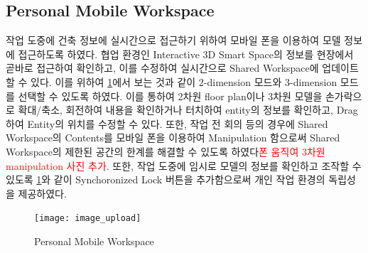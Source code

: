 \subsection{Personal Mobile Workspace}
작업 도중에 건축 정보에 실시간으로 접근하기 위하여 모바일 폰을 이용하여 모델 정보에 접근하도록 하였다. 협업 환경인 Interactive 3D Smart Space의 정보를 현장에서 곧바로 접근하여 확인하고, 이를 수정하여 실시간으로 Shared Workspace에 업데이트할 수 있다. 이를 위하여 \ref{fig:pmw}에서 보는 것과 같이 2-dimension 모드와 3-dimension 모드를 선택할 수 있도록 하였다. 이를 통하여 2차원 floor plan이나 3차원 모델을 손가락으로 확대/축소, 회전하여 내용을 확인하거나 터치하여 entity의 정보를 확인하고, Drag하여 Entity의 위치를 수정할 수 있다. 또한, 작업 전 회의 등의 경우에 Shared Workspace의 Contents를 모바일 폰을 이용하여 Manipulation 함으로써 Shared Workspace의 제한된 공간의 한계를 해결할 수 있도록 하였다\textcolor{red}{폰 움직여 3차원 manipulation 사진 추가}. 또한, 작업 도중에 임시로 모델의 정보를 확인하고 조작할 수 있도록 \ref{fig:pmw}와 같이 Synchoronized Lock 버튼을 추가함으로써 개인 작업 환경의 독립성을 제공하였다. 
\begin{figure}[!h]
\centering
\texttt{[image: image\_upload]}
\caption{Personal Mobile Workspace}
\label{fig:pmw}
\end{figure}
